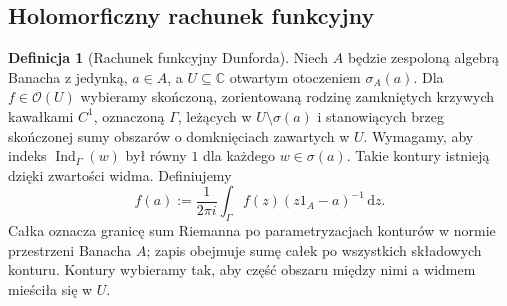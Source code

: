 \documentclass[11pt,a4paper]{article}
\numberwithin{equation}{section}
\theoremstyle{plain}
\theoremstyle{definition}
\newtheorem{definicja}[twierdzenie]{Definicja}
\theoremstyle{remark}
\newcommand{\C}{\mathbb C}
\begin{document}
\subsection{Holomorficzny rachunek funkcyjny}

\begin{definicja}[Rachunek funkcyjny Dunforda]
\label{def:holomorphic-calculus31}
Niech $A$ będzie zespoloną algebrą Banacha z jedynką, $a\in A$,
a $U\subseteq\C$ otwartym otoczeniem $\sigma_A(a)$.
Dla $f\in\mathcal O(U)$ wybieramy skończoną, zorientowaną
rodzinę zamkniętych krzywych kawałkami $C^1$, oznaczoną $\Gamma$,
leżących w $U\setminus\sigma(a)$ i stanowiących brzeg
skończonej sumy obszarów o domknięciach zawartych w $U$.
Wymagamy, aby indeks $\operatorname{Ind}_\Gamma(w)$ był równy $1$
dla każdego $w\in\sigma(a)$.
Takie kontury istnieją dzięki zwartości widma.
Definiujemy
\[
 f(a):=\frac{1}{2\pi i}\int_\Gamma f(z)(z1_A-a)^{-1}\,\mathrm dz.
\]
Całka oznacza granicę sum Riemanna po parametryzacjach konturów
w normie przestrzeni Banacha $A$; zapis obejmuje sumę całek
po wszystkich składowych konturu. Kontury wybieramy tak, aby część
obszaru między nimi a widmem mieściła się w $U$.
\end{definicja}
\end{document}
